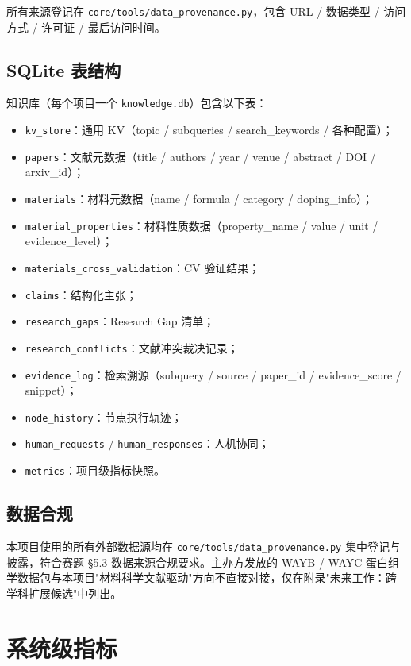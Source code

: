 \documentclass[11pt,a4paper]{article}
\begin{document}
所有来源登记在 \texttt{core/tools/data\_provenance.py}，包含 URL / 数据类型 / 访问方式 / 许可证 / 最后访问时间。

\subsection{SQLite 表结构}

知识库（每个项目一个 \texttt{knowledge.db}）包含以下表：

\begin{itemize}[leftmargin=2em]
\item \texttt{kv\_store}：通用 KV（topic / subqueries / search\_keywords / 各种配置）；
\item \texttt{papers}：文献元数据（title / authors / year / venue / abstract / DOI / arxiv\_id）；
\item \texttt{materials}：材料元数据（name / formula / category / doping\_info）；
\item \texttt{material\_properties}：材料性质数据（property\_name / value / unit / evidence\_level）；
\item \texttt{materials\_cross\_validation}：CV 验证结果；
\item \texttt{claims}：结构化主张；
\item \texttt{research\_gaps}：Research Gap 清单；
\item \texttt{research\_conflicts}：文献冲突裁决记录；
\item \texttt{evidence\_log}：检索溯源（subquery / source / paper\_id / evidence\_score / snippet）；
\item \texttt{node\_history}：节点执行轨迹；
\item \texttt{human\_requests} / \texttt{human\_responses}：人机协同；
\item \texttt{metrics}：项目级指标快照。
\end{itemize}

\subsection{数据合规}

本项目使用的所有外部数据源均在 \texttt{core/tools/data\_provenance.py} 集中登记与披露，符合赛题 §5.3 数据来源合规要求。主办方发放的 WAYB / WAYC 蛋白组学数据包与本项目"材料科学文献驱动"方向不直接对接，仅在附录"未来工作：跨学科扩展候选"中列出。

\section{系统级指标}
\end{document}

